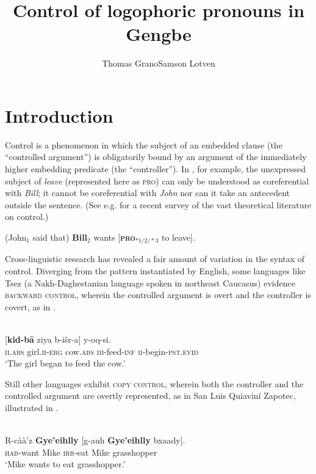 \documentclass[output=paper,modfonts,nonflat]{langsci/langscibook}
\title{Control of logophoric pronouns in Gengbe}
\author{Thomas Grano\affiliation{Indiana University}\lastand Samson Lotven\affiliation{Indiana University} }
\begin{document}
\maketitle
\section{Introduction} 
\label{sec:Grano:Introduction:1}

Control is a phenomenon in which the subject of an embedded clause (the ``controlled argument'') is obligatorily bound by an argument of the immediately higher embedding predicate (the ``controller''). In , for example, the unexpressed subject of \emph{leave} (represented here as \textsc{pro}) can only be understood as coreferential with \emph{Bill}; it cannot be coreferential with \emph{John} nor can it take an antecedent outside the sentence. (See e.g. \citealt{Landau2013} for a recent survey of the vast theoretical literature on control.)

\ea (John$_{1}$ said that) {\textbf{Bill}$_{2}$} wants [{\textbf{\textsc{pro}}}$_{*1/2/*3}$ to leave]. \label{ex:grano:1}
\z

Cross-linguistic research has revealed a fair amount of variation in the syntax of control. Diverging from the pattern instantiated by English, some languages like Tsez (a Nakh-Daghestanian language spoken in northeast Caucasus) evidence \textsc{backward control}, wherein the controlled argument is overt and the controller is covert, as in .

\ea \label{ex:grano:2}
\\
\gll {\textbf{$\emptyset$}} [\textbf{kid-b\={a}} ziya b-i\v{s}r-a] y-oq-si.\\
\textsc{ii}.\textsc{abs} girl.\textsc{ii}-\textsc{erg} cow.\textsc{abs} \textsc{iii}-feed-\textsc{inf} \textsc{ii}-begin-\textsc{pst}.\textsc{evid}\\
\glt `The girl began to feed the cow.'
\z

Still other languages exhibit \textsc{copy control}, wherein both the controller and the controlled argument are overtly represented, as in San Luis Quiavin\'i Zapotec, illustrated in .

\ea \label{ex:grano:3}
\\
\gll R-c\`a\`a'z \textbf{Gye'eihlly} [g-auh \textbf{Gye'eihlly} bxaady].\\
\textsc{hab}-want Mike \textsc{irr}-eat Mike grasshopper\\
\glt `Mike wants to eat grasshopper.' \\
\z
\end{document}
